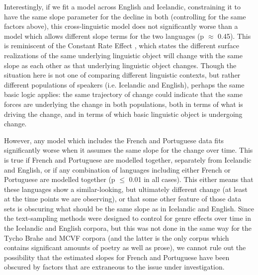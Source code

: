 
Interestingly, if we fit a model across English and Icelandic, constraining it to have the same slope parameter for the decline in both (controlling for the same factors above), this cross-linguistic model does not significantly worse than a model which allows different slope terms for the two languages (p $\approx$ 0.45). This is reminiscent of the Constant Rate Effect \citep[][among others]{kroch1989, pintzuk1991, santorini1993a}, which states the different surface realizations of the same underlying linguistic object will change with the same slope as each other as that underlying linguistic object changes. Though the situation here is not one of comparing different linguistic contexts, but rather different populations of speakers (i.e. Icelandic and English), perhaps the same basic logic applies: the same trajectory of change could indicate that the same forces are underlying the change in both populations, both in terms of what is driving the change, and in terms of which basic linguistic object is undergoing change. 

However, any model which includes the French and Portuguese data fits significantly worse when it assumes the same slope for the change over time. This is true if French and Portuguese are modelled together, separately from Icelandic and English, or if any combination of languages including either French or Portuguese are modelled together (p $\leq$ 0.01 in all cases). This either means that these languages show a similar-looking, but ultimately different change (at least at the time points we are observing), or that some other feature of those data sets is obscuring what should be the same slope as in Icelandic and English. Since the text-sampling methods were designed to control for genre effects over time in the Icelandic and English corpora, but this was not done in the same way for the Tycho Brahe and MCVF corpora (and the latter is the only corpus which contains significant amounts of poetry as well as prose), we cannot rule out the possibility that the estimated slopes for French and Portuguese have been obscured by factors that are extraneous to the issue under investigation.



